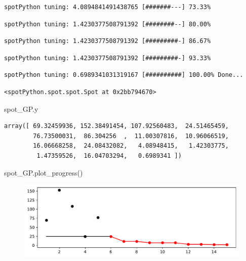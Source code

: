 \documentclass[
  letterpaper,
  DIV=11,
  numbers=noendperiod]{scrreprt}
\newenvironment{Shaded}{\begin{snugshade}}{\end{snugshade}}
\newcommand{\NormalTok}[1]{\textcolor[rgb]{0.00,0.23,0.31}{#1}}
\begin{document}
\begin{verbatim}
spotPython tuning: 4.0894841491438765 [#######---] 73.33% 
\end{verbatim}

\begin{verbatim}
spotPython tuning: 1.4230377508791392 [########--] 80.00% 
\end{verbatim}

\begin{verbatim}
spotPython tuning: 1.4230377508791392 [#########-] 86.67% 
\end{verbatim}

\begin{verbatim}
spotPython tuning: 1.4230377508791392 [#########-] 93.33% 
\end{verbatim}

\begin{verbatim}
spotPython tuning: 0.6989341031319167 [##########] 100.00% Done...
\end{verbatim}

\begin{verbatim}
<spotPython.spot.spot.Spot at 0x2bb794670>
\end{verbatim}

\begin{Shaded}
\begin{Highlighting}[]
\NormalTok{spot\_GP.y}
\end{Highlighting}
\end{Shaded}

\begin{verbatim}
array([ 69.32459936, 152.38491454, 107.92560483,  24.51465459,
        76.73500031,  86.304256  ,  11.00307816,  10.96066519,
        16.06668258,  24.08432082,   4.08948415,   1.42303775,
         1.47359526,  16.04703294,   0.6989341 ])
\end{verbatim}

\begin{Shaded}
\begin{Highlighting}[]
\NormalTok{spot\_GP.plot\_progress()}
\end{Highlighting}
\end{Shaded}

\begin{figure}[H]

{\centering \includegraphics{012_num_spot_ei_files/figure-pdf/cell-35-output-1.pdf}

}

\end{figure}
\end{document}
